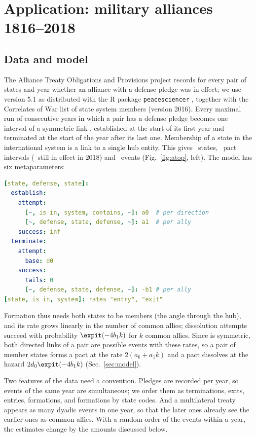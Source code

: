 \section{Application: military alliances 1816--2018}\label{sec:application}

\subsection{Data and model}
The Alliance Treaty Obligations and Provisions project \citep{leeds2002} records for every pair of states and year whether an alliance with a defense pledge was in effect; we use version 5.1 as distributed with the R package \texttt{peacesciencer} \citep{miller2022}, together with the Correlates of War list of state system members (version 2016).
Every maximal run of consecutive years in which a pair has a defense pledge becomes one interval of a symmetric link , established at the start of its first year and terminated at the start of the year after its last one.
Membership of a state in the international system is a link  to a single hub entity.
This gives \AtopStates\ states, \AtopIntervals\ pact intervals (\AtopCensored\ still in effect in 2018) and \AtopEvents\ events (Fig.~\ref{fig:atop}, left).
The model has six metaparameters:
\par\noindent\begin{minipage}{\linewidth}
\begin{lstlisting}[language=yaml]
[state, defense, state]:
  establish:
    attempt:
      [~, is in, system, contains, ~]: a0  # per direction
      [~, defense, state, defense, ~]: a1  # per ally
    success: inf
  terminate:
    attempt:
      base: d0
    success:
      tails: 0
      [~, defense, state, defense, ~]: -b1 # per ally
[state, is in, system]: rates "entry", "exit"
\end{lstlisting}
\end{minipage}
\noindent Formation thus needs both states to be members (the angle through the hub), and its rate
grows linearly in the number of common allies; dissolution attempts succeed with probability $\expit(-4 b_1 k)$ for $k$ common allies.
Since  is symmetric, both directed links of a pair are possible events with these rates, so a pair of member states forms a pact at the rate $2(a_0 + a_1 k)$ and a pact dissolves at the hazard $2 d_0 \expit(-4 b_1 k)$ (Sec.~\ref{sec:model}).

Two features of the data need a convention.
Pledges are recorded per year, so events of the same year are simultaneous; we order them as terminations, exits, entries, formations, and formations by state codes.
And a multilateral treaty appears as many dyadic events in one year, so that the later ones already see the earlier ones as common allies.
With a random order of the events within a year, the estimates change by the amounts discussed below.


